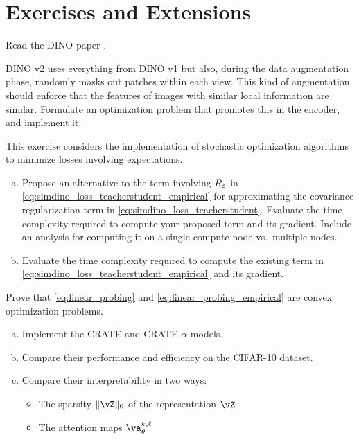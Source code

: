 \documentclass[../../book-main.tex]{subfiles}
\begin{document}
\section{Exercises and Extensions}

\begin{exercise}
    Read the DINO paper \cite{caron2021emerging}.
\end{exercise}

\begin{exercise}
    DINO v2 \cite{oquab2023dinov2} uses everything from DINO v1 but also, during the data augmentation phase, randomly masks out patches within each view. This kind of augmentation should enforce that the features of images with similar local information are similar. Formulate an optimization problem that promotes this in the encoder, and implement it.
\end{exercise}


\begin{exercise}
    This exercise considers the implementation of stochastic optimization algorithms to minimize losses involving expectations.
    \begin{enumerate}[(a)]
        \item Propose an alternative to the term involving \(R_{\varepsilon}\) in \eqref{eq:simdino_loss_teacherstudent_empirical} for approximating the covariance regularization term in \eqref{eq:simdino_loss_teacherstudent}. Evaluate the time complexity required to compute your proposed term and its gradient. Include an analysis for computing it on a single compute node vs.~multiple nodes.
        \item Evaluate the time complexity required to compute the existing term in \eqref{eq:simdino_loss_teacherstudent_empirical} and its gradient.
    \end{enumerate}
\end{exercise}

\begin{exercise}
    Prove that \eqref{eq:linear_probing} and \eqref{eq:linear_probing_empirical} are convex optimization problems.
\end{exercise}

\begin{exercise}
    \phantom{}
    \begin{enumerate}[(a)]
        \item Implement the CRATE and CRATE-\(\alpha\) models.
        \item Compare their performance and efficiency on the CIFAR-10 dataset.
        \item Compare their interpretability in two ways:
        \begin{itemize}
            \item The sparsity \(\norm{\vZ}_{0}\) of the representation \(\vZ\)
            \item The attention maps \(\va_{\theta}^{k, \ell}\)
        \end{itemize}
    \end{enumerate}
\end{exercise}
\end{document}
